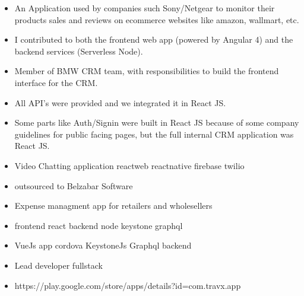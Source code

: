 \documentclass[10pt,a4paper,ragged2e]{altacv}
\begin{document}

\begin{itemize}
\item An Application used by companies such Sony/Netgear to monitor their products sales and reviews on ecommerce websites like amazon, wallmart, etc.
\item I contributed to both the frontend web app (powered by Angular 4) and the backend services (Serverless Node).
\end{itemize}
\smallskip
\smallskip

\divider

\begin{itemize}
\item Member of BMW CRM team, with responsibilities to build the frontend interface for the CRM. 
\item All API’s were provided and we integrated it in React JS. 
\item Some parts like Auth/Signin were built in React JS because of some company guidelines for public facing pages, but the full internal CRM application was React JS.
\end{itemize}
\smallskip
\smallskip


\begin{itemize}
\item Video Chatting application reactweb reactnative firebase twilio
\item outsourced to Belzabar Software
\end{itemize}
\smallskip
\smallskip 

\begin{itemize}
\item Expense managment app for retailers and wholesellers 
\item frontend react backend node keystone graphql
\end{itemize}
\smallskip
\smallskip 

\begin{itemize}
\item VueJs app cordova KeystoneJs Graphql backend
\item Lead developer fullstack
\item https://play.google.com/store/apps/details?id=com.travx.app
\end{itemize}
\smallskip
\smallskip 
\end{document}
